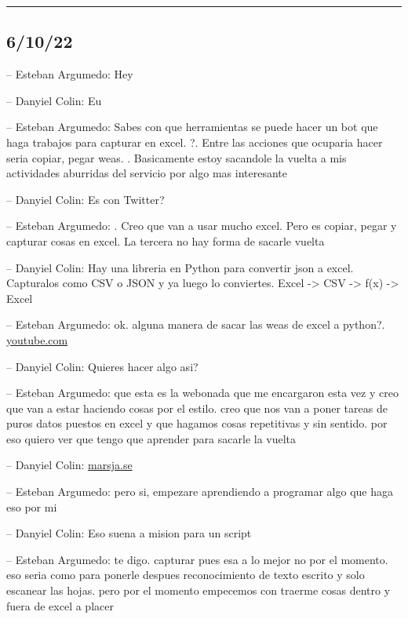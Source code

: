 \begin{center}\rule{0.5\linewidth}{0.5pt}\end{center}

\hypertarget{section-99}{%
\subsection{6/10/22}\label{section-99}}

-- Esteban Argumedo: Hey

-- Danyiel Colin: Eu

-- Esteban Argumedo: Sabes con que herramientas se puede hacer un bot
que haga trabajos para capturar en excel. ?. Entre las acciones que
ocuparia hacer seria copiar, pegar weas. . Basicamente estoy sacandole
la vuelta a mis actividades aburridas del servicio por algo mas
interesante

-- Danyiel Colin: Es con Twitter?

-- Esteban Argumedo: . Creo que van a usar mucho excel. Pero es copiar,
pegar y capturar cosas en excel. La tercera no hay forma de sacarle
vuelta

-- Danyiel Colin: Hay una libreria en Python para convertir json a
excel. Capturalos como CSV o JSON y ya luego lo conviertes. Excel
-\textgreater{} CSV -\textgreater{} f(x) -\textgreater{} Excel

-- Esteban Argumedo: ok. alguna manera de sacar las weas de excel a
python?. \href{https://www.youtube.com/watch?v=07IuleZPQug}{youtube.com}

-- Danyiel Colin: Quieres hacer algo asi?

-- Esteban Argumedo: que esta es la webonada que me encargaron esta vez
y creo que van a estar haciendo cosas por el estilo. creo que nos van a
poner tareas de puros datos puestos en excel y que hagamos cosas
repetitivas y sin sentido. por eso quiero ver que tengo que aprender
para sacarle la vuelta

-- Danyiel Colin:
\href{https://www.marsja.se/your-guide-to-reading-excel-xlsx-files-in-python/}{marsja.se}

-- Esteban Argumedo: pero si, empezare aprendiendo a programar algo que
haga eso por mi

-- Danyiel Colin: Eso suena a mision para un script

-- Esteban Argumedo: te digo. capturar pues esa a lo mejor no por el
momento. eso seria como para ponerle despues reconocimiento de texto
escrito y solo escanear las hojas. pero por el momento empecemos con
traerme cosas dentro y fuera de excel a placer


